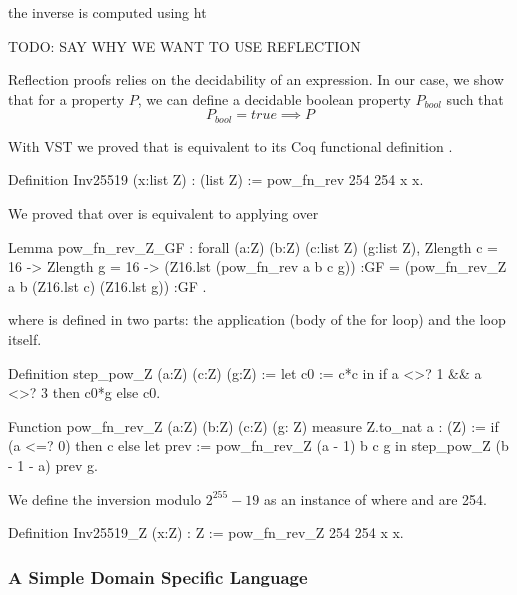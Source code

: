  the inverse is computed using ht

{\red TODO: SAY WHY WE WANT TO USE REFLECTION}

Reflection proofs relies on the decidability of an expression. In our case,
we show that for a property $P$, we can define a decidable
boolean property $P_{bool}$ such that $$P_{bool} = true \implies P$$

With VST we proved that  is equivalent to its Coq functional
definition .

\begin{coqD}
Definition Inv25519 (x:list Z) : (list Z) :=
  pow_fn_rev 254 254 x x.
\end{coqD}

We proved that  over  is equivalent to applying
 over 

\begin{coqD}
Lemma pow_fn_rev_Z_GF :
  forall (a:Z) (b:Z) (c:list Z) (g:list Z),
  Zlength c = 16 ->
  Zlength g = 16 ->
  (Z16.lst (pow_fn_rev a b c g)) :GF =
  (pow_fn_rev_Z a b (Z16.lst c) (Z16.lst g)) :GF .
\end{coqD}

where  is defined in two parts: the application
(body of the for loop) and the loop itself.

\begin{coqD}
Definition step_pow_Z (a:Z) (c:Z) (g:Z) :=
  let c0 := c*c in
  if a <>? 1 && a <>? 3
    then c0*g
    else c0.
\end{coqD}

\begin{coqD}
Function pow_fn_rev_Z (a:Z) (b:Z) (c:Z) (g: Z)
  {measure Z.to_nat a} : (Z) :=
  if (a <=? 0)
    then c
    else
      let prev := pow_fn_rev_Z (a - 1) b c g in
        step_pow_Z (b - 1 - a) prev g.
\end{coqD}

We define the inversion modulo $2^{255}-19$ as an instance of  where  and  are 254.

\begin{coqD}
Definition Inv25519_Z (x:Z) : Z :=
  pow_fn_rev_Z 254 254 x x.
\end{coqD}


\subsubsection{A Simple Domain Specific Language}

